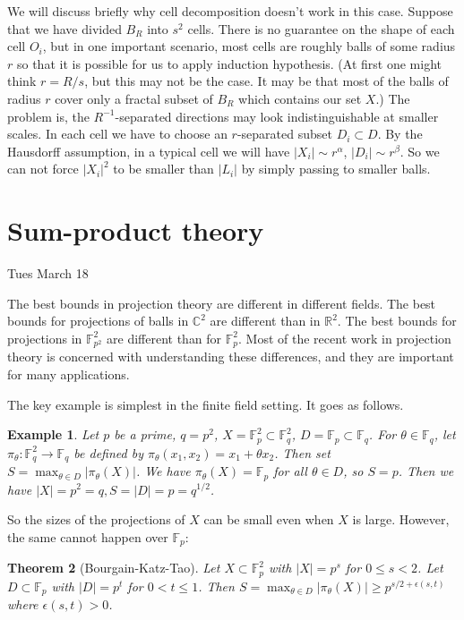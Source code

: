 \documentclass[12pt]{amsart}
\newtheorem{theorem}{Theorem}[section]
\newtheorem{example}[theorem]{Example}
\newcommand{\F}{\mathbb{F}}
\newcommand{\FF}{\mathbb{F}}
\newcommand{\CC}{\mathbb{C}}
\newcommand{\RR}{\mathbb{R}}
\newcommand{\eps}{\epsilon}
\begin{document}
We will discuss briefly why cell decomposition doesn't work in this case. Suppose that we have divided $B_R$ into $s^2$ cells. There is no guarantee on the shape of each cell $O_i$, but in one important scenario, most cells   are roughly balls of some radius $r$ so that it is possible for us to apply induction hypothesis. (At first one might think $r = R/s$, but this may not be the case.  It may be that most of the balls of radius $r$ cover only a fractal subset of $B_R$ which contains our set $X$.)  
The problem is, the $R^{-1}$-separated directions may look indistinguishable at smaller scales. In each cell we have to choose an $r$-separated subset $D_i \subset D$. By the Hausdorff assumption, in a typical cell we will have $|X_i| \sim r^\alpha$, $|D_i| \sim r^\beta$. So we can not force $|X_i|^2$ to be smaller than $|L_i|$ by simply passing to smaller balls.

\newpage


\section{Sum-product theory}

Tues March 18

The best bounds in projection theory are different in different fields.  The best bounds for projections of balls in $\CC^2$ are different than in $\RR^2$.   The best bounds for projections in $\FF_{p^2}^2$ are different than for $\FF_p^2$.   Most of the recent work in projection theory is concerned with understanding these differences,  and they are important for many applications.

The key example is simplest in the finite field setting.  It goes as follows.  

\begin{example}\label{eg:1.1}
    Let $p$ be a prime, $q=p^2$, $X=\F_p^2\subset\F_q^2$, $D=\F_p\subset\F_q$. For $\theta\in\F_q$, let $\pi_\theta:\F_q^2\to\F_q$ be defined by $\pi_\theta(x_1,x_2)=x_1+\theta x_2$. Then set $S=\max_{\theta\in D}|\pi_\theta(X)|$. We have $\pi_\theta(X)=\F_p$ for all $\theta\in D$, so $S=p$. Then we have $|X|=p^2=q,S=|D|=p=q^{1/2}$. 
\end{example}

So the sizes of the projections of $X$ can be small even when $X$ is large. However, the same cannot happen over $\F_p$:

\begin{theorem}[Bourgain-Katz-Tao]\label{thm:bkt}
    Let $X\subset\F_p^2$ with $|X|=p^s$ for $0\leq s<2$. Let $D\subset\F_p$ with $|D|=p^t$ for $0<t\leq 1$. Then $S=\max_{\theta\in D}|\pi_\theta(X)|\geq p^{s/2+\eps(s,t)}$ where $\eps(s,t)>0$.
\end{theorem}
\end{document}
